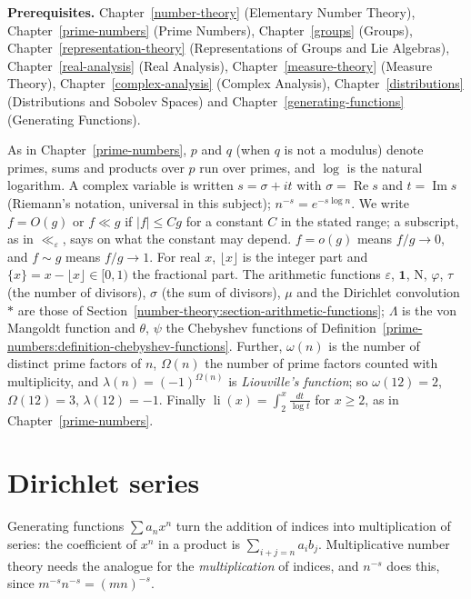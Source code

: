 \noindent\textbf{Prerequisites.} Chapter~\ref{number-theory} (Elementary Number Theory), Chapter~\ref{prime-numbers} (Prime Numbers), Chapter~\ref{groups} (Groups), Chapter~\ref{representation-theory} (Representations of Groups and Lie Algebras),
Chapter~\ref{real-analysis} (Real Analysis), Chapter~\ref{measure-theory} (Measure Theory), Chapter~\ref{complex-analysis} (Complex Analysis), Chapter~\ref{distributions} (Distributions and Sobolev
Spaces) and Chapter~\ref{generating-functions} (Generating Functions).

\begin{notation}\label{analytic-number-theory:notation-basic}
As in Chapter~\ref{prime-numbers}, $p$ and $q$ (when $q$ is not a modulus) denote primes, sums and products over $p$ run over primes, and $\log$ is the natural logarithm. A complex variable is
written $s = \sigma + it$ with $\sigma = \operatorname{Re}s$ and $t = \operatorname{Im}s$ (Riemann's notation, universal in this subject); $n^{-s} = e^{-s\log n}$. We write
$f = O(g)$ or $f \ll g$ if $|f| \leq Cg$ for a constant $C$ in the stated range; a subscript, as in $\ll_\varepsilon$, says on what the constant may depend. $f = o(g)$ means $f/g \to 0$, and
$f \sim g$ means $f/g \to 1$. For real $x$, $\lfloor x\rfloor$ is the integer part and $\{x\} = x - \lfloor x\rfloor \in [0, 1)$ the fractional part. The arithmetic functions $\varepsilon$, $\mathbf{1}$,
$\mathrm{N}$, $\varphi$, $\tau$ (the number of divisors), $\sigma$ (the sum of divisors), $\mu$ and the Dirichlet convolution $*$ are those of Section~\ref{number-theory:section-arithmetic-functions};
$\Lambda$ is the von Mangoldt function and $\theta$, $\psi$ the Chebyshev functions of Definition~\ref{prime-numbers:definition-chebyshev-functions}. Further, $\omega(n)$ is the number of distinct
prime factors of $n$, $\Omega(n)$ the number of prime factors counted with multiplicity, and $\lambda(n) = (-1)^{\Omega(n)}$ is \emph{Liouville's function}; so $\omega(12) = 2$, $\Omega(12) = 3$,
$\lambda(12) = -1$. Finally $\operatorname{li}(x) = \int_2^x\frac{dt}{\log t}$ for $x \geq 2$, as in Chapter~\ref{prime-numbers}.
\end{notation}

\section{Dirichlet series}\label{analytic-number-theory:section-dirichlet-series}

Generating functions $\sum a_nx^n$ turn the addition of indices into multiplication of series: the coefficient of $x^n$ in a product is $\sum_{i + j = n}a_ib_j$. Multiplicative number theory needs the
analogue for the \emph{multiplication} of indices, and $n^{-s}$ does this, since $m^{-s}n^{-s} = (mn)^{-s}$.

